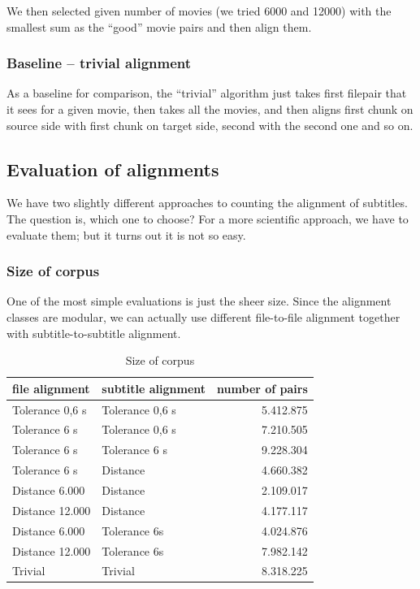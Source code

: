 We then selected given number of movies (we tried 6000 and 12000) with the smallest sum as the ``good'' movie pairs and then align them.

\subsubsection{Baseline -- trivial alignment}
As a baseline for comparison, the ``trivial'' algorithm just takes first filepair that it sees for a given movie, then takes all the movies, and then aligns first chunk on source side with first chunk on target side, second with the second one and so on.

\subsection{Evaluation of alignments}
We have two slightly different approaches to counting the alignment of subtitles. The question is, which one to choose? For a more scientific approach, we have to evaluate them; but it turns out it is not so easy.

\subsubsection{Size of corpus}
One of the most simple evaluations is just the sheer size. Since the alignment classes are modular, we can actually use different file-to-file alignment together with subtitle-to-subtitle alignment.

\begin{table}[h]
\begin{center}
\begin{tabular}{|l|l|r|}
    \hline
    \textbf{file alignment} & \textbf{subtitle alignment} & \textbf{number of pairs} \\ \hline
    Tolerance 0,6 s & Tolerance 0,6 s & 5.412.875 \\ \hline
    Tolerance 6 s & Tolerance 0,6 s & 7.210.505 \\  \hline
    Tolerance 6 s & Tolerance 6 s & 9.228.304 \\ \hline
    Tolerance 6 s & Distance & 4.660.382 \\ \hline
    Distance 6.000 & Distance & 2.109.017 \\ \hline
    Distance 12.000 & Distance & 4.177.117 \\ \hline
    Distance 6.000 & Tolerance 6s & 4.024.876 \\ \hline
    Distance 12.000 & Tolerance 6s & 7.982.142 \\ \hline
    Trivial & Trivial & 8.318.225 \\ \hline
    
\end{tabular}
\end{center}

\caption{Size of corpus}\label{corpusize}
\end{table}

